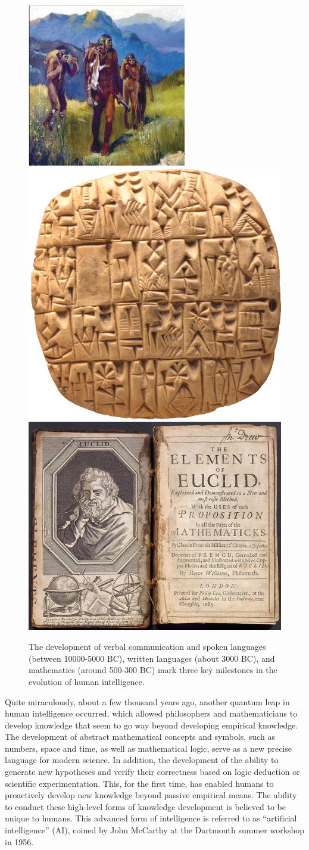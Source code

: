 \documentclass[../../book-main.tex]{subfiles}
\begin{document}
\begin{figure}
    \centering
    \includegraphics[height=0.25\linewidth]{figs_chap1/Spoken-language.jpg}
   \hspace{5mm} \includegraphics[height=0.25\linewidth]{figs_chap1/Cuneiform.png}
   \hspace{5mm} \includegraphics[height=0.25\linewidth]{figs_chap1/adopt-euclid1685-2.jpg}
    \caption{The development of verbal communication and spoken languages (between 10000-5000 BC), written languages (about 3000 BC), and mathematics (around 500-300 BC) mark three key milestones in the evolution of human intelligence.}
    \label{fig:human-intelligence}
\end{figure}

Quite miraculously, about a few thousand years ago, another quantum leap in human intelligence occurred, which allowed philosophers and mathematicians to develop knowledge that seem to go way beyond developing empirical knowledge. The development of abstract mathematical concepts and symbols, such as numbers, space and time, as well as mathematical logic, serve as a new precise language for modern science. In addition, the development of the ability to generate new hypotheses and verify their correctness based on  logic deduction or scientific experimentation. This, for the first time, has enabled humans to proactively develop new knowledge beyond passive empirical means. The ability to conduct these high-level forms of knowledge development is believed to be unique to humans. This advanced form of intelligence is referred to as ``artificial intelligence'' (AI), coined by John McCarthy at the Dartmouth summer workshop in 1956. 
\end{document}
